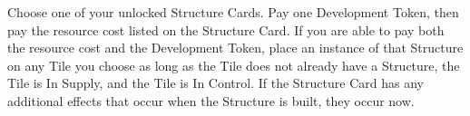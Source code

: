 Choose one of your unlocked Structure Cards. Pay one Development Token, then pay the resource cost listed on the Structure Card. If you are able to pay both the resource cost and the Development Token, place an instance of that Structure on any Tile you choose as long as the Tile does not already have a Structure, the Tile is In Supply, and the Tile is In Control. If the Structure Card has any additional effects that occur when the Structure is built, they occur now. 
